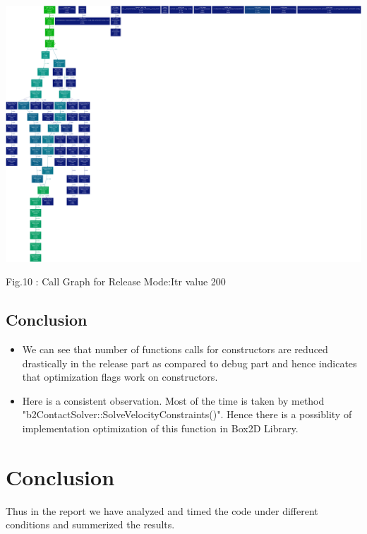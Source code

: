 \documentclass[a4paper,11pt]{article}
\begin{document}
\begin{center}
\includegraphics[scale=0.1]{./doc/rel_output200.png}
\begin{center}
Fig.10 : Call Graph for Release Mode:Itr value 200
\end{center}
\end{center}

\subsection{Conclusion}
\begin{itemize}
\item{We can see that number of functions calls for constructors are reduced drastically in the release part as compared to debug part and hence indicates that optimization ﬂags work on constructors.}

\item{Here is a consistent observation. Most of the time is taken by method "b2ContactSolver::SolveVelocityConstraints()". Hence there is a possiblity of implementation optimization of this function in Box2D Library.}
\end{itemize}

\section{Conclusion}
Thus in the report we have analyzed and timed the code under different conditions and summerized the results.



{}
\end{document}
